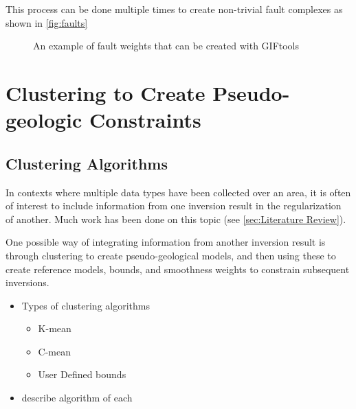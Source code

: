 This process can be done multiple times to create non-trivial fault complexes as shown in \autoref{fig:faults}

\begin{figure} [h]
    \centering
    \caption{An example of fault weights that can be created with GIFtools}
    \label{fig:faults}
\end{figure}
\FloatBarrier

\section{Clustering to Create Pseudo-geologic Constraints}
\label{sec:cluster}

\subsection{Clustering Algorithms}
\label{subsec:clusterAlgo}

In contexts where multiple data types have been collected over an area, it is often of interest to include information from one inversion result in the regularization of another. Much work has been done on this topic (see \autoref{sec:Literature Review}).

One possible way of integrating information from another inversion result is through clustering to create pseudo-geological models, and then using these to create reference models, bounds, and smoothness weights to constrain subsequent inversions.

\begin{itemize}
 \item Types of clustering algorithms
 \begin{itemize}
  \item K-mean
  \item C-mean
  \item User Defined bounds
 \end{itemize}
 \item describe algorithm of each
\end{itemize}


